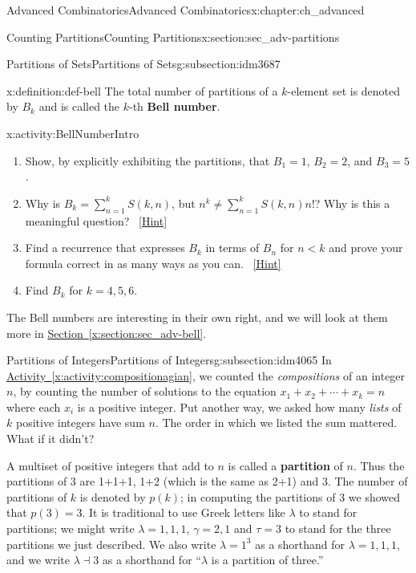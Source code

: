 \documentclass[oneside,10pt,]{book}
\newcommand{\terminology}[1]{\textbf{#1}}
\numberwithin{equation}{chapter}
\newcommand{\lt}{<}
\begin{document}
\begin{chapterptx}{Advanced Combinatorics}{}{Advanced Combinatorics}{}{}{x:chapter:ch_advanced}
\begin{sectionptx}{Counting Partitions}{}{Counting Partitions}{}{}{x:section:sec_adv-partitions}
\begin{subsectionptx}{Partitions of Sets}{}{Partitions of Sets}{}{}{g:subsection:idm3687}
\begin{definition}{}{x:definition:def-bell}%
%
%
The total number of partitions of a \(k\)-element set is denoted by \(B_k\) and is called the \(k\)-th \terminology{Bell number}.%
\end{definition}
\begin{activity}{}{x:activity:BellNumberIntro}%
\begin{enumerate}[font=\bfseries,label=(\alph*),ref=\alph*]
\item{}Show, by explicitly exhibiting the partitions, that \(B_1 = 1\), \(B_2 = 2\), and \(B_3 = 5\).%
\item{}Why is \(B_k = \sum_{n=1}^{k} S(k,n)\), but \(n^k \ne \sum_{n=1}^k S(k,n)n!\)?  Why is this a meaningful question?%
\qquad~\hfill{\tiny\hyperlink{g:hint:idm4028-back}{[Hint]}}\item{}Find a recurrence that expresses \(B_k\) in terms of \(B_n\) for \(n\lt  k\) and prove your formula correct in as many ways as you can.%
\qquad~\hfill{\tiny\hyperlink{g:hint:idm4038-back}{[Hint]}}\item{}Find \(B_k\) for \(k=4,5,6\).%
\end{enumerate}
\end{activity}
The Bell numbers are interesting in their own right, and we will look at them more in \hyperref[x:section:sec_adv-bell]{Section~\ref{x:section:sec_adv-bell}}.%
\end{subsectionptx}
%
%
\typeout{************************************************}
\typeout{************************************************}
%
\begin{subsectionptx}{Partitions of Integers}{}{Partitions of Integers}{}{}{g:subsection:idm4065}
In \hyperref[x:activity:compositionagian]{Activity~\ref{x:activity:compositionagian}}, we counted the \emph{compositions} of an integer \(n\), by counting the number of solutions to the equation \(x_1 + x_2 + \cdots + x_k = n\) where each \(x_i\) is a positive integer.  Put another way, we asked how many \emph{lists} of \(k\) positive integers have sum \(n\).  The order in which we listed the sum mattered.  What if it didn't?%
\par
A multiset of positive integers that add to \(n\) is called a \terminology{partition} of \(n\). Thus the partitions of 3 are 1+1+1, 1+2 (which is the same as 2+1) and 3. The number of partitions of \(k\) is denoted by \(p(k)\); in computing the partitions of 3 we showed that \(p(3) = 3\). It is traditional to use Greek letters like \(\lambda\) to stand for partitions; we might write \(\lambda = 1,1,1\), \(\gamma= 2,1\) and \(\tau = 3\) to stand for the three partitions we just described. We also write \(\lambda = 1^3\) as a shorthand for \(\lambda = 1,1,1\), and we write \(\lambda \dashv 3\) as a shorthand for ``\(\lambda\) is a partition of three.''%

\end{subsectionptx}
\end{sectionptx}
\end{chapterptx}
\end{document}
